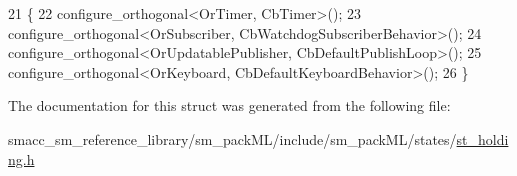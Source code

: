 \begin{DoxyCode}
21     \{
22         configure\_orthogonal<OrTimer, CbTimer>();   
23         configure\_orthogonal<OrSubscriber, CbWatchdogSubscriberBehavior>();
24         configure\_orthogonal<OrUpdatablePublisher, CbDefaultPublishLoop>();
25         configure\_orthogonal<OrKeyboard, CbDefaultKeyboardBehavior>();
26     \}
\end{DoxyCode}


The documentation for this struct was generated from the following file\+:\begin{DoxyCompactItemize}
\item 
smacc\+\_\+sm\+\_\+reference\+\_\+library/sm\+\_\+pack\+M\+L/include/sm\+\_\+pack\+M\+L/states/\hyperlink{st__holding_8h}{st\+\_\+holding.\+h}\end{DoxyCompactItemize}
